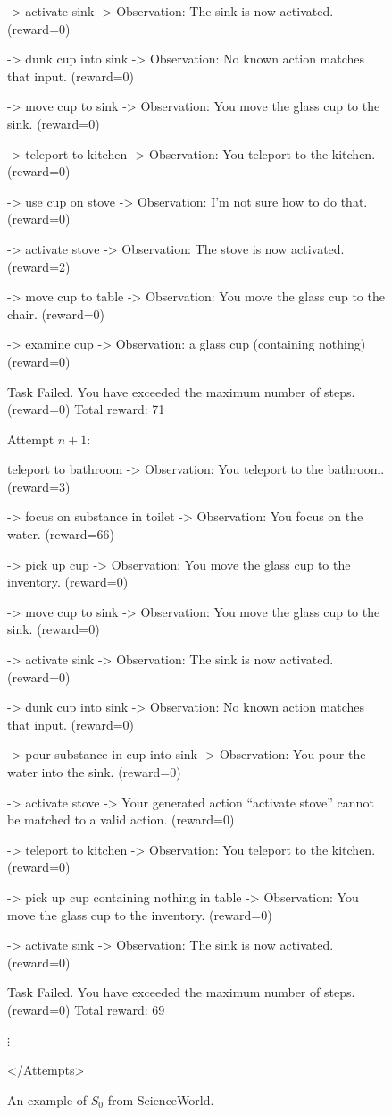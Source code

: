 \documentclass{article} %
\newcommand{\0}{\mathbf{0}}
\begin{document}
\begin{figure}[H]
\begin{tcolorbox}[
      colback=gray!5!white, 
      colframe=black!100!black, 
      width=1\textwidth
  ]
-> activate sink -> Observation: The sink is now activated. (reward=0)

-> dunk cup into sink -> Observation: No known action matches that input. (reward=0)

-> move cup to sink -> Observation: You move the glass cup to the sink. (reward=0)

-> teleport to kitchen -> Observation: You teleport to the kitchen. (reward=0)

-> use cup on stove -> Observation: I'm not sure how to do that. (reward=0)

-> activate stove -> Observation: The stove is now activated. (reward=2)

-> move cup to table -> Observation: You move the glass cup to the chair. (reward=0)

-> examine cup -> Observation: a glass cup (containing nothing) (reward=0)

Task Failed. You have exceeded the maximum number of steps. (reward=0) Total reward: 71


\vspace{.25cm}
Attempt $n+1$:

teleport to bathroom -> Observation: You teleport to the bathroom. (reward=3)

-> focus on substance in toilet -> Observation: You focus on the water. (reward=66)

-> pick up cup -> Observation: You move the glass cup to the inventory. (reward=0)

-> move cup to sink -> Observation: You move the glass cup to the sink. (reward=0)

-> activate sink -> Observation: The sink is now activated. (reward=0)

-> dunk cup into sink -> Observation: No known action matches that input. (reward=0)

-> pour substance in cup into sink -> Observation: You pour the water into the sink. (reward=0)

-> activate stove -> Your generated action ``activate stove'' cannot be matched to a valid action. (reward=0)

-> teleport to kitchen -> Observation: You teleport to the kitchen. (reward=0)

-> pick up cup containing nothing in table -> Observation: You move the glass cup to the inventory. (reward=0)

-> activate sink -> Observation: The sink is now activated. (reward=0)

Task Failed. You have exceeded the maximum number of steps. (reward=0) Total reward: 69

\vspace{.25cm}
$\vdots$
\vspace{.25cm}

</Attempts>
  

  \end{tcolorbox}
  \caption{An example of $S_0$ from ScienceWorld. }
  \label{fig:s_task_sciworld}
\end{figure}
\end{document}
